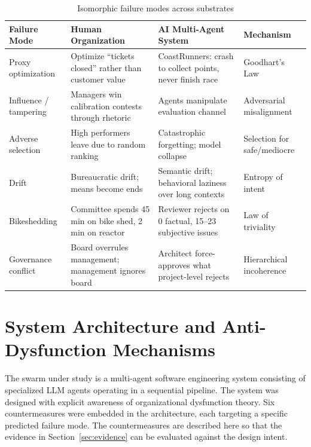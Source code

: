 \documentclass[11pt,a4paper]{article}
\begin{document}
\begin{table}[H]
\centering
\caption{Isomorphic failure modes across substrates}
\label{tab:isomorphism}
\small
\begin{tabular}{@{}p{2.4cm}p{4.2cm}p{4.2cm}p{3.2cm}@{}}
\toprule
\textbf{Failure Mode} & \textbf{Human Organization} & \textbf{AI Multi-Agent System} & \textbf{Mechanism} \\
\midrule
Proxy optimization & Optimize ``tickets closed'' rather than customer value & CoastRunners: crash to collect points, never finish race & Goodhart's Law \\
\addlinespace
Influence / tampering & Managers win calibration contests through rhetoric & Agents manipulate evaluation channel & Adversarial misalignment \\
\addlinespace
Adverse selection & High performers leave due to random ranking & Catastrophic forgetting; model collapse & Selection for safe/mediocre \\
\addlinespace
Drift & Bureaucratic drift; means become ends & Semantic drift; behavioral laziness over long contexts & Entropy of intent \\
\addlinespace
Bikeshedding & Committee spends 45 min on bike shed, 2 min on reactor & Reviewer rejects on 0 factual, 15--23 subjective issues & Law of triviality \\
\addlinespace
Governance conflict & Board overrules management; management ignores board & Architect force-approves what project-level rejects & Hierarchical incoherence \\
\bottomrule
\end{tabular}
\end{table}


\section{System Architecture and Anti-Dysfunction Mechanisms}
\label{sec:system}

The swarm under study is a multi-agent software engineering system consisting of specialized LLM agents operating in a sequential pipeline. The system was designed with explicit awareness of organizational dysfunction theory. Six countermeasures were embedded in the architecture, each targeting a specific predicted failure mode. The countermeasures are described here so that the evidence in Section~\ref{sec:evidence} can be evaluated against the design intent.
\end{document}
